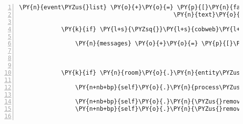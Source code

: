 \begin{Verbatim}[commandchars=\\\{\},numbers=left,firstnumber=1,stepnumber=1]
            \PY{n}{event\PYZus{}list} \PY{o}{+}\PY{o}{=} \PY{p}{[}\PY{n}{fabula}\PY{o}{.}\PY{n}{SaysEvent}\PY{p}{(}\PY{n}{identifier}\PY{o}{=}\PY{n}{ID\PYZus{}KUNI}\PY{p}{,}
                                            \PY{n}{text}\PY{o}{=}\PY{l+s}{\PYZsq{}}\PY{l+s}{Deine Flügel sind wieder ganz, du kannst wieder fliegen!}\PY{l+s}{\PYZsq{}}\PY{p}{)}\PY{p}{]}

            \PY{k}{if} \PY{l+s}{\PYZsq{}}\PY{l+s}{cobweb}\PY{l+s}{\PYZsq{}} \PY{o+ow}{not} \PY{o+ow}{in} \PY{n}{room}\PY{o}{.}\PY{n}{entity\PYZus{}dict}\PY{o}{.}\PY{n}{keys}\PY{p}{(}\PY{p}{)}\PY{p}{:}

                \PY{n}{messages} \PY{o}{+}\PY{o}{=} \PY{p}{[}\PY{n}{fabula}\PY{o}{.}\PY{n}{Message}\PY{p}{(}\PY{p}{[}\PY{n}{fabula}\PY{o}{.}\PY{n}{DropsEvent}\PY{p}{(}\PY{n}{ID\PYZus{}KUNI}\PY{p}{,}
                                                               \PY{n+nb+bp}{self}\PY{o}{.}\PY{n}{host}\PY{o}{.}\PY{n}{rack}\PY{o}{.}\PY{n}{entity\PYZus{}dict}\PY{p}{[}\PY{l+s}{\PYZsq{}}\PY{l+s}{cobweb}\PY{l+s}{\PYZsq{}}\PY{p}{]}\PY{p}{,}
                                                               \PY{n}{room}\PY{o}{.}\PY{n}{entity\PYZus{}locations}\PY{p}{[}\PY{n}{ID\PYZus{}CASSANDRA}\PY{p}{]}\PY{p}{)}\PY{p}{]}\PY{p}{)}\PY{p}{]}

            \PY{k}{if} \PY{n}{room}\PY{o}{.}\PY{n}{entity\PYZus{}locations}\PY{p}{[}\PY{l+s}{\PYZsq{}}\PY{l+s}{spider}\PY{l+s}{\PYZsq{}}\PY{p}{]} \PY{o}{==} \PY{p}{(}\PY{l+m+mi}{1}\PY{p}{,} \PY{l+m+mi}{0}\PY{p}{)}\PY{p}{:}

                \PY{n+nb+bp}{self}\PY{o}{.}\PY{n}{process\PYZus{}TriesToMoveEvent}\PY{p}{(}\PY{n}{fabula}\PY{o}{.}\PY{n}{TriesToMoveEvent}\PY{p}{(}\PY{n}{identifier}\PY{o}{=}\PY{l+s}{\PYZsq{}}\PY{l+s}{spider}\PY{l+s}{\PYZsq{}}\PY{p}{,}
                                                                      \PY{n}{arget\PYZus{}identifier}\PY{o}{=}\PY{p}{(}\PY{l+m+mi}{0}\PY{p}{,} \PY{l+m+mi}{4}\PY{p}{)}\PY{p}{)}\PY{p}{)}
                \PY{n+nb+bp}{self}\PY{o}{.}\PY{n}{\PYZus{}remove\PYZus{}sentence}\PY{p}{(}\PY{n}{ID\PYZus{}KUNI}\PY{p}{,} \PY{l+s}{\PYZsq{}}\PY{l+s}{Hinter der Spinne ist doch irgendwas!}\PY{l+s}{\PYZsq{}}\PY{p}{)}
                \PY{n+nb+bp}{self}\PY{o}{.}\PY{n}{\PYZus{}remove\PYZus{}sentence}\PY{p}{(}\PY{n}{ID\PYZus{}CASSANDRA}\PY{p}{,} \PY{l+s}{\PYZsq{}}\PY{l+s}{Die Spinne verbirgt etwas!}\PY{l+s}{\PYZsq{}}\PY{p}{)}


\end{Verbatim}
